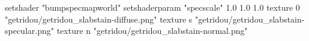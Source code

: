 setshader "bumpspecmapworld"
setshaderparam "specscale" 1.0 1.0 1.0
texture 0 "getridou/getridou_slabstain-diffuse.png"
texture s "getridou/getridou_slabstain-specular.png"
texture n "getridou/getridou_slabstain-normal.png"
